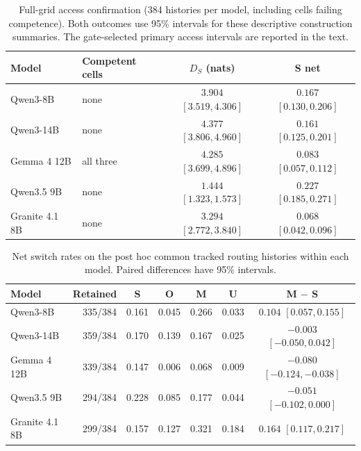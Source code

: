 \begin{table}[t]
\centering
\begin{tabular}{@{}llcc@{}}
\toprule
Model & Competent cells & $D_S$ (nats) & S net \\
\midrule
Qwen3-8B & none & $3.904$ ${[3.519, 4.306]}$ & $0.167$ ${[0.130, 0.206]}$ \\
Qwen3-14B & none & $4.377$ ${[3.806, 4.960]}$ & $0.161$ ${[0.125, 0.201]}$ \\
Gemma 4 12B & all three & $4.285$ ${[3.699, 4.896]}$ & $0.083$ ${[0.057, 0.112]}$ \\
Qwen3.5 9B & none & $1.444$ ${[1.323, 1.573]}$ & $0.227$ ${[0.185, 0.271]}$ \\
Granite 4.1 8B & none & $3.294$ ${[2.772, 3.840]}$ & $0.068$ ${[0.042, 0.096]}$ \\
\bottomrule
\end{tabular}
\caption{Full-grid access confirmation (384 histories per model, including cells failing competence). Both outcomes use 95\% intervals for these descriptive construction summaries. The gate-selected primary access intervals are reported in the text.}
\label{tab:access}
\end{table}
\begin{table}[t]
\centering
\begin{tabular}{@{}lrccccc@{}}
\toprule
Model & Retained & S & O & M & U & M $-$ S \\
\midrule
Qwen3-8B & 335/384 & 0.161 & 0.045 & 0.266 & 0.033 & $0.104$ ${[0.057, 0.155]}$ \\
Qwen3-14B & 359/384 & 0.170 & 0.139 & 0.167 & 0.025 & $-0.003$ ${[-0.050, 0.042]}$ \\
Gemma 4 12B & 339/384 & 0.147 & 0.006 & 0.068 & 0.009 & $-0.080$ ${[-0.124, -0.038]}$ \\
Qwen3.5 9B & 294/384 & 0.228 & 0.085 & 0.177 & 0.044 & $-0.051$ ${[-0.102, 0.000]}$ \\
Granite 4.1 8B & 299/384 & 0.157 & 0.127 & 0.321 & 0.184 & $0.164$ ${[0.117, 0.217]}$ \\
\bottomrule
\end{tabular}
\caption{Net switch rates on the post hoc common tracked routing histories within each model. Paired differences have 95\% intervals.}
\label{tab:tracked}
\end{table}

